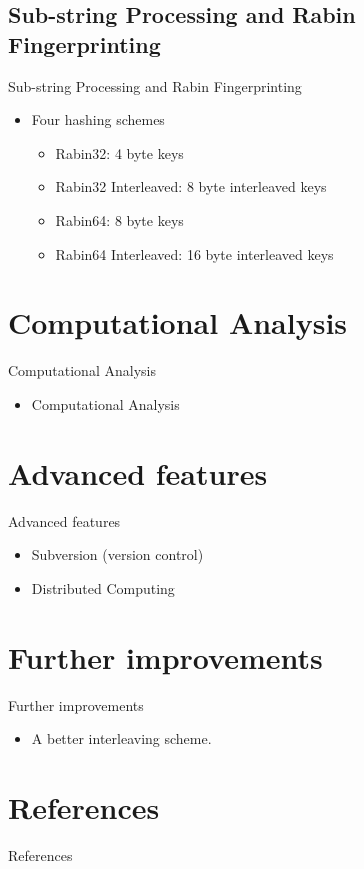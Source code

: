 \documentclass{beamer}
\begin{document}
\subsection{Sub-string Processing and Rabin Fingerprinting}
\begin{frame}{Sub-string Processing and Rabin Fingerprinting}
	\begin{itemize}
	\item Four hashing schemes
		\begin{itemize}
		\item Rabin32: 4 byte keys
		\item Rabin32 Interleaved: 8 byte interleaved keys
		\item Rabin64: 8 byte keys
		\item Rabin64 Interleaved: 16 byte interleaved keys
		\end{itemize}
	\end{itemize}
\end{frame}

\section{Computational Analysis}
\begin{frame}{Computational Analysis}
	\begin{itemize}
	\item Computational Analysis
	\end{itemize}
\end{frame}

\section{Advanced features}
\begin{frame}{Advanced features}
	\begin{itemize}
	\item Subversion (version control)
	\item Distributed Computing
	\end{itemize}
\end{frame}

\section{Further improvements}
\begin{frame}{Further improvements}
	\begin{itemize}
	\item A better interleaving scheme.
	\end{itemize}
\end{frame}

\section{References}
\begin{frame}{References}
	\nocite{*}
	
\end{frame}
\end{document}
